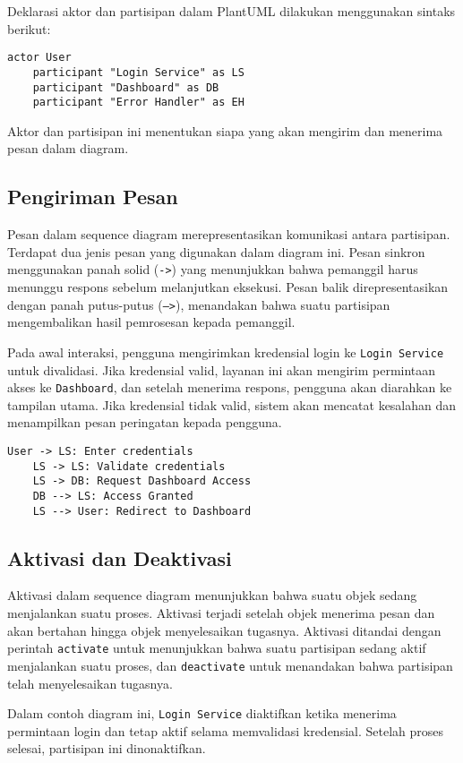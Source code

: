 Deklarasi aktor dan partisipan dalam PlantUML dilakukan menggunakan sintaks berikut:
\begin{lstlisting}[language=puml]
	actor User
	participant "Login Service" as LS
	participant "Dashboard" as DB
	participant "Error Handler" as EH
\end{lstlisting}
Aktor dan partisipan ini menentukan siapa yang akan mengirim dan menerima pesan dalam diagram.

\subsection{Pengiriman Pesan}
Pesan dalam sequence diagram merepresentasikan komunikasi antara partisipan. Terdapat dua jenis pesan yang digunakan dalam diagram ini. Pesan sinkron menggunakan panah solid (\texttt{->}) yang menunjukkan bahwa pemanggil harus menunggu respons sebelum melanjutkan eksekusi. Pesan balik direpresentasikan dengan panah putus-putus (\texttt{-->}), menandakan bahwa suatu partisipan mengembalikan hasil pemrosesan kepada pemanggil.

Pada awal interaksi, pengguna mengirimkan kredensial login ke \texttt{Login Service} untuk divalidasi. Jika kredensial valid, layanan ini akan mengirim permintaan akses ke \texttt{Dashboard}, dan setelah menerima respons, pengguna akan diarahkan ke tampilan utama. Jika kredensial tidak valid, sistem akan mencatat kesalahan dan menampilkan pesan peringatan kepada pengguna.

\begin{lstlisting}[language=puml]
	User -> LS: Enter credentials
	LS -> LS: Validate credentials
	LS -> DB: Request Dashboard Access
	DB --> LS: Access Granted
	LS --> User: Redirect to Dashboard
\end{lstlisting}

\subsection{Aktivasi dan Deaktivasi}
Aktivasi dalam sequence diagram menunjukkan bahwa suatu objek sedang menjalankan suatu proses. Aktivasi terjadi setelah objek menerima pesan dan akan bertahan hingga objek menyelesaikan tugasnya. Aktivasi ditandai dengan perintah \texttt{activate} untuk menunjukkan bahwa suatu partisipan sedang aktif menjalankan suatu proses, dan \texttt{deactivate} untuk menandakan bahwa partisipan telah menyelesaikan tugasnya.

Dalam contoh diagram ini, \texttt{Login Service} diaktifkan ketika menerima permintaan login dan tetap aktif selama memvalidasi kredensial. Setelah proses selesai, partisipan ini dinonaktifkan.

